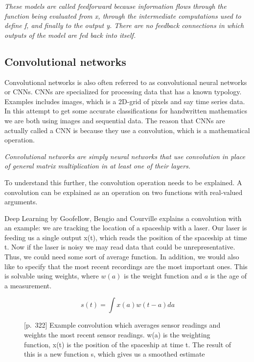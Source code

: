 \begin{displayquote}
\textit{These models are called feedforward because information flows through the function being evaluated from x, through the intermediate computations used to define f, and finally to the output y. There are no feedback connections in which outputs of the model are fed back into itself.}
\end{displayquote}

\subsection{Convolutional networks}

Convolutional networks \cite{lecun_generalization_1989} is also often referred to as convolutional neural networks or CNNs. CNNs are specialized for processing data that has a known typology. Examples includes images, which is a 2D-grid of pixels and say time series data. In this attempt to get some accurate classifications for handwritten mathematics we are both using images and sequential data. The reason that CNNs are actually called a CNN is because they use a convolution, which is a mathematical operation.

\begin{displayquote}
 \textit{Convolutional networks are simply neural networks that use convolution in place of general matrix multiplication in at least one of their layers.}
\end{displayquote}
To understand this further, the convolution operation needs to be explained. A convolution can be explained as an operation on two functions with real-valued arguments. 

Deep Learning by Goofellow, Bengio and Courville explains a convolution with an example: we are tracking the location of a spaceship with a laser. Our laser is feeding us a single output x(t), which reads the position of the spaceship at time t. Now if the laser is noisy we may read data that could be unrepresentative. Thus, we could need some sort of average function. In addition, we would also like to specify that the most recent recordings are the most important ones. This is solvable using weights, where $w(a)$ is the weight function and $a$ is the age of a measurement. \cite{goodfellow_deep_2016}

\begin{figure}[H]
    \label{eqn:conv}
    \begin{equation}
    s(t) = \int x(a)w(t-a)da
    \end{equation}
    \caption{\cite{goodfellow_deep_2016}[p.~322] Example convolution which averages sensor readings and weights the most recent sensor readings. w(a) is the weighting function, x(t) is the position of the spaceship at time t. The result of this is a new function s, which gives us a smoothed estimate}
\end{figure}

